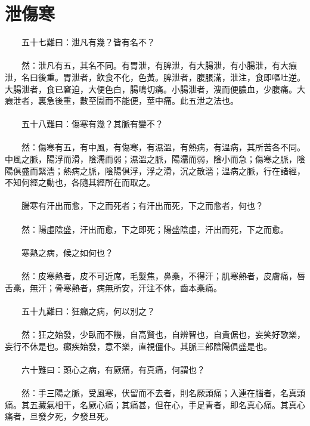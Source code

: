 \section{泄傷寒}

　　五十七難曰：泄凡有幾？皆有名不？
\\\\
　　然：泄凡有五，其名不同。有胃泄，有脾泄，有大腸泄，有小腸泄，有大瘕泄，名曰後重。胃泄者，飲食不化，色黃。脾泄者，腹脹滿，泄注，食即嘔吐逆。大腸泄者，食已窘迫，大便色白，腸鳴切痛。小腸泄者，溲而便膿血，少腹痛。大瘕泄者，裏急後重，數至圊而不能便，莖中痛。此五泄之法也。
\\\\
　　五十八難曰：傷寒有幾？其脈有變不？
\\\\
　　然：傷寒有五，有中風，有傷寒，有濕溫，有熱病，有溫病，其所苦各不同。中風之脈，陽浮而滑，陰濡而弱；濕溫之脈，陽濡而弱，陰小而急；傷寒之脈，陰陽俱盛而緊濇；熱病之脈，陰陽俱浮，浮之滑，沉之散濇；溫病之脈，行在諸經，不知何經之動也，各隨其經所在而取之。
\\\\
　　腸寒有汗出而愈，下之而死者；有汗出而死，下之而愈者，何也？
\\\\
　　然：陽虛陰盛，汗出而愈，下之即死；陽盛陰虛，汗出而死，下之而愈。
\\\\
　　寒熱之病，候之如何也？
\\\\
　　然：皮寒熱者，皮不可近席，毛髮焦，鼻槀，不得汗；肌寒熱者，皮膚痛，唇舌槀，無汗；骨寒熱者，病無所安，汗注不休，齒本槀痛。
\\\\
　　五十九難曰：狂癲之病，何以別之？
\\\\
　　然：狂之始發，少臥而不饑，自高賢也，自辨智也，自貴倨也，妄笑好歌樂，妄行不休是也。癲疾始發，意不樂，直視僵仆。其脈三部陰陽俱盛是也。
\\\\
　　六十難曰：頭心之病，有厥痛，有真痛，何謂也？
\\\\
　　然：手三陽之脈，受風寒，伏留而不去者，則名厥頭痛；入連在腦者，名真頭痛。其五藏氣相干，名厥心痛；其痛甚，但在心，手足青者，即名真心痛。其真心痛者，旦發夕死，夕發旦死。